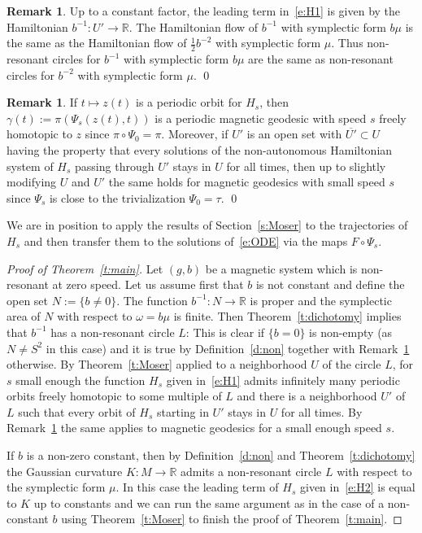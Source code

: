 \documentclass[10pt]{amsart}
\theoremstyle{definition}
\newtheorem{rema}[cdrthm]{Remark}
\newcommand{\R}{\mathbb{R}}
\begin{document}
\begin{rema}\label{r:bb}
Up to a constant factor, the leading term in~\eqref{e:H1} is given by the Hamiltonian $b^{-1}:U'\to\R$. The Hamiltonian flow of $b^{-1}$ with symplectic form $b\mu$ is the same as the Hamiltonian flow of $\tfrac12b^{-2}$ with symplectic form $\mu$. Thus non-resonant circles for $b^{-1}$ with symplectic form $b\mu$ are the same as non-resonant circles for $b^{-2}$ with symplectic form $\mu$. \qed
\end{rema}

\begin{rema}\label{r:psis}
If $t\mapsto z(t)$ is a periodic orbit for $H_s$, then $\gamma(t):=\pi(\Psi_s(z(t),t))$ is a periodic magnetic geodesic with speed $s$ freely homotopic to $z$ since $\pi\circ\Psi_0=\pi$. Moreover, if $U'$ is an open set with $\overline{U'}\subset U$ having the property that every solutions of the non-autonomous Hamiltonian system of $H_s$ passing through $U'$ stays in $U$ for all times, then up to slightly modifying $U$ and $U'$ the same holds for magnetic geodesics with small speed $s$ since $\Psi_s$ is close to the trivialization $\Psi_0=\tau$. \qed
\end{rema}

We are in position to apply the results of Section~\ref{s:Moser} to the trajectories of $H_s$ and then transfer them to the solutions of~\eqref{e:ODE} via the maps $F\circ\Psi_s$.

\begin{proof}[Proof of Theorem~\ref{t:main}]
Let $(g,b)$ be a magnetic system which is non-resonant at zero speed. Let us assume first that $b$ is not constant and define the open set $N:=\{b\neq0\}$. The function $b^{-1}:N\to\R$ is proper and the symplectic area of $N$ with respect to $\omega=b\mu$ is finite. Then Theorem~\ref{t:dichotomy} implies that $b^{-1}$ has a non-resonant circle $L$: This is clear if $\{b=0\}$ is non-empty (as $N\neq S^2$ in this case) and it is true by Definition~\ref{d:non} together with Remark~\ref{r:bb} otherwise. By Theorem~\ref{t:Moser} applied to a neighborhood $U$ of the circle $L$, for $s$ small enough the function $H_s$ given in~\eqref{e:H1} admits infinitely many periodic orbits freely homotopic to some multiple of $L$ and there is a neighborhood $U'$ of $L$ such that every orbit of $H_s$ starting in $U'$ stays in $U$ for all times. By Remark~\ref{r:psis} the same applies to magnetic geodesics for a small enough speed $s$.

If $b$ is a non-zero constant, then by Definition~\ref{d:non} and Theorem~\ref{t:dichotomy} the Gaussian curvature $K:M\to\R$ admits a non-resonant circle $L$ with respect to the symplectic form $\mu$. In this case the leading term of $H_s$ given in~\eqref{e:H2} is equal to $K$ up to constants and we can run the same argument as in the case of a non-constant $b$ using Theorem~\ref{t:Moser} to finish the proof of Theorem~\ref{t:main}.
\end{proof}
\end{document}
